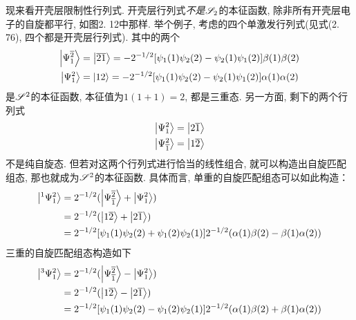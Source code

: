 现来看开壳层限制性行列式. 
开壳层行列式\emph{不是}$\mathscr{S}_2$的本征函数, 
除非所有开壳层电子的自旋都平行, 
如图2.
12中那样. 
举个例子, 
考虑的四个单激发行列式(见式(2.
76), 
四个都是开壳层行列式). 
其中的两个
\begin{subequations}
	\begin{align}
	\Ket{\Psi_1^{\overline{2}}} & = \Ket{\overline{2}\overline{1}} = -2^{-1/2}[\psi_1(1)\psi_2(2) - \psi_2(1)\psi_1(2)]\beta(1)\beta(2)\\
	\Ket{\Psi_1^{{2}}} & = \Ket{12}  = -2^{-1/2}[\psi_1(1)\psi_2(2) - \psi_2(1)\psi_1(2)]\alpha(1)\alpha(2)\\
	\end{align}
\end{subequations} 
是$\mathscr{S}^2$的本征函数, 
本征值为$1(1+1)=2$, 
都是三重态. 
另一方面, 
剩下的两个行列式
\begin{subequations}
	\begin{align}
	\Ket{\Psi_1^2} & = \Ket{2\overline{1}}\\
	\Ket{\Psi_{\overline{1}}^{2}} & = \Ket{1\overline{2}}
	\end{align}
\end{subequations} 
不是纯自旋态. 
但若对这两个行列式进行恰当的线性组合, 
就可以构造出自旋匹配组态, 
那也就成为$\mathscr{S}^2$的本征函数. 
具体而言, 
单重的自旋匹配组态可以如此构造：
\begin{align}
\Ket{^1\Psi_1^2} & = 2^{-1/2}(\Ket{\Psi_{\overline{1}}^{\overline{2}}} + \Ket{\Psi_1^2}) \notag\\
& =2^{-1/2}(\Ket{1\overline{2}} + \Ket{2\overline{1}})\notag \\
& =2^{-1/2}[ \psi_1(1)\psi_2(2) + \psi_1(2)\psi_2(1)] 2^{-1/2}(\alpha(1)\beta(2) - \beta(1)\alpha(2))
\end{align}
三重的自旋匹配组态构造如下
\begin{align}
\Ket{^3\Psi_1^2} & = 2^{-1/2}(\Ket{\Psi_{\overline{1}}^{\overline{2}}} - \Ket{\Psi_1^2}) \notag\\
& =2^{-1/2}(\Ket{1\overline{2}} - \Ket{2\overline{1}})\notag \\
& =2^{-1/2}[ \psi_1(1)\psi_2(2) - \psi_1(2)\psi_2(1)] 2^{-1/2}(\alpha(1)\beta(2) + \beta(1)\alpha(2))
\end{align}

